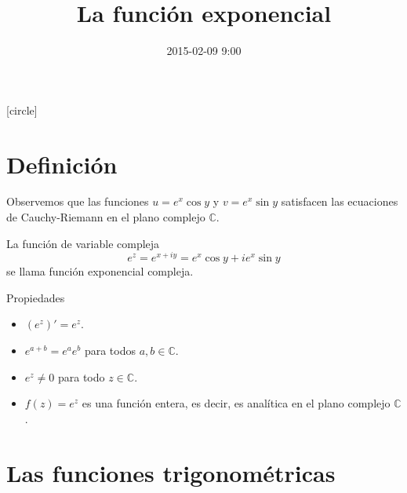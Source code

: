 \documentclass[spanish,presentation]{beamer}
\date{2015-02-09 9:00}
\title{La función exponencial}
\begin{document}
\maketitle
{}
[circle]

\tableofcontents

\section{Definición}
\label{sec-1}

\begin{frame}[label=sec-1-1]{}
\begin{block}{}
Observemos que las funciones \(u=e^{x}\cos y\) y \(v=e^{x}\sin y\)
satisfacen las ecuaciones de Cauchy-Riemann en el plano complejo
\(\mathbb{C}\). 
\end{block}

\begin{definition}[:B_definition:]
La función de variable compleja
\begin{displaymath}
e^{z}=e^{x+iy}=e^{x}\cos y+ie^{x}\sin y
\end{displaymath}
se llama \alert{función exponencial compleja}.
\end{definition}
\end{frame}

\begin{frame}[label=sec-1-2]{Propiedades}
\begin{itemize}
\item \((e^{z})'=e^{z}\).
\item \(e^{a+b}=e^{a}e^{b}\) para todos \(a,b\in \mathbb{C}\).
\item \(e^{z}\ne 0\) para todo \(z\in \mathbb{C}\).
\item \(f(z)=e^{z}\) es una función \alert{entera}, es decir, es analítica en
el plano complejo \(\mathbb{C}\).
\end{itemize}
\end{frame}

\section{Las funciones trigonométricas}
\label{sec-2}
\end{document}
